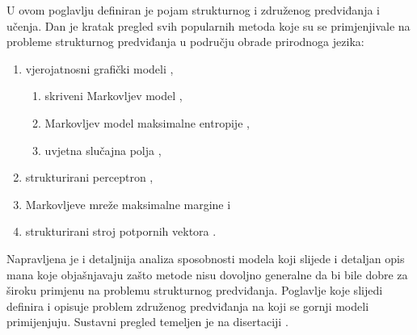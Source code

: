 U ovom poglavlju definiran je pojam strukturnog i združenog predviđanja i
učenja. Dan je kratak pregled svih popularnih metoda koje su se primjenjivale na
probleme strukturnog predviđanja u području obrade prirodnoga jezika:
\begin{enumerate}
  \item vjerojatnosni grafički modeli ,
  \begin{enumerate}
    \item skriveni Markovljev model ,
    \item Markovljev model maksimalne entropije ,
    \item uvjetna slučajna polja ,
  \end{enumerate}
  \item strukturirani perceptron ,
  \item Markovljeve mreže maksimalne margine  i
  \item strukturirani stroj potpornih vektora .
\end{enumerate}
Napravljena je i detaljnija analiza sposobnosti modela koji slijede i detaljan
opis mana koje objašnjavaju zašto metode nisu dovoljno generalne da bi bile
dobre za široku primjenu na problemu strukturnog predviđanja. Poglavlje koje
slijedi definira i opisuje problem združenog predviđanja na koji se gornji
modeli primijenjuju. Sustavni pregled temeljen je na disertaciji
\citep{daume06thesis}.
